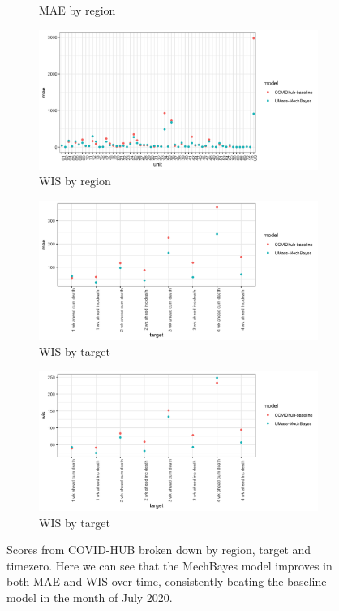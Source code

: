 \documentclass[11pt]{amsart}
\begin{document}
\begin{figure}
\begin{subfigure}{.5\textwidth}
    \caption{MAE by region}
\end{subfigure}%
\begin{subfigure}{.5\textwidth}
  \centering
    \includegraphics[scale=.1]{wis_results_by_region.png}
    \caption{WIS by region}
\end{subfigure}
\begin{subfigure}{.5\textwidth}
  \centering
    \includegraphics[scale=.1]{mae_results_by_target.png}
    \caption{WIS by target}
\end{subfigure}%
\begin{subfigure}{.5\textwidth}
  \centering
    \includegraphics[scale=.1]{wis_results_by_target.png}
    \caption{WIS by target}
\end{subfigure}%

\caption{Scores from COVID-HUB broken down by region, target and timezero. Here we can see that the MechBayes model improves in both MAE and WIS over time, consistently beating the baseline model in the month of July 2020.  }
\label{fig:covidhub}
\end{figure}
\end{document}
